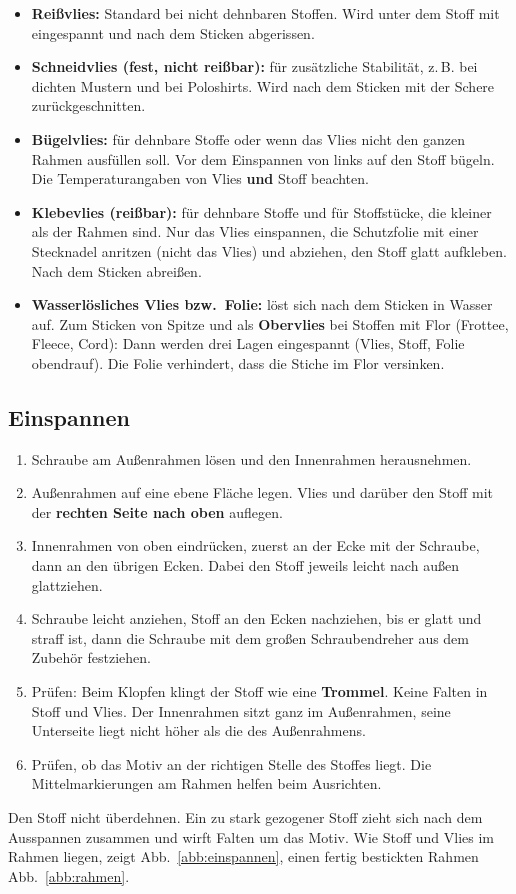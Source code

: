 \documentclass{\basedir/fablab-document}
\begin{document}
	\begin{itemize}
		\item \textbf{Reißvlies:} Standard bei nicht dehnbaren Stoffen. Wird unter dem Stoff mit eingespannt und nach dem Sticken abgerissen.
		\item \textbf{Schneidvlies (fest, nicht reißbar):} für zusätzliche Stabilität, z.\,B. bei dichten Mustern und bei Poloshirts. Wird nach dem Sticken mit der Schere zurückgeschnitten.
		\item \textbf{Bügelvlies:} für dehnbare Stoffe oder wenn das Vlies nicht den ganzen Rahmen ausfüllen soll. Vor dem Einspannen von links auf den Stoff bügeln. Die Temperaturangaben von Vlies \textbf{und} Stoff beachten.
		\item \textbf{Klebevlies (reißbar):} für dehnbare Stoffe und für Stoffstücke, die kleiner als der Rahmen sind. Nur das Vlies einspannen, die Schutzfolie mit einer Stecknadel anritzen (nicht das Vlies) und abziehen, den Stoff glatt aufkleben. Nach dem Sticken abreißen.
		\item \textbf{Wasserlösliches Vlies bzw.\ Folie:} löst sich nach dem Sticken in Wasser auf. Zum Sticken von Spitze und als \textbf{Obervlies} bei Stoffen mit Flor (Frottee, Fleece, Cord): Dann werden drei Lagen eingespannt (Vlies, Stoff, Folie obendrauf). Die Folie verhindert, dass die Stiche im Flor versinken.
	\end{itemize}

	\subsection{Einspannen}
	\begin{enumerate}
		\item Schraube am Außenrahmen lösen und den Innenrahmen herausnehmen.
		\item Außenrahmen auf eine ebene Fläche legen. Vlies und darüber den Stoff mit der \textbf{rechten Seite nach oben} auflegen.
		\item Innenrahmen von oben eindrücken, zuerst an der Ecke mit der Schraube, dann an den übrigen Ecken. Dabei den Stoff jeweils leicht nach außen glattziehen.
		\item Schraube leicht anziehen, Stoff an den Ecken nachziehen, bis er glatt und straff ist, dann die Schraube mit dem großen Schraubendreher aus dem Zubehör festziehen.
		\item Prüfen: Beim Klopfen klingt der Stoff wie eine \textbf{Trommel}. Keine Falten in Stoff und Vlies. Der Innenrahmen sitzt ganz im Außenrahmen, seine Unterseite liegt nicht höher als die des Außenrahmens.
		\item Prüfen, ob das Motiv an der richtigen Stelle des Stoffes liegt. Die Mittelmarkierungen am Rahmen helfen beim Ausrichten.
	\end{enumerate}
	Den Stoff nicht überdehnen. Ein zu stark gezogener Stoff zieht sich nach dem Ausspannen zusammen und wirft Falten um das Motiv. Wie Stoff und Vlies im Rahmen liegen, zeigt Abb.~\ref{abb:einspannen}, einen fertig bestickten Rahmen Abb.~\ref{abb:rahmen}.
\end{document}
